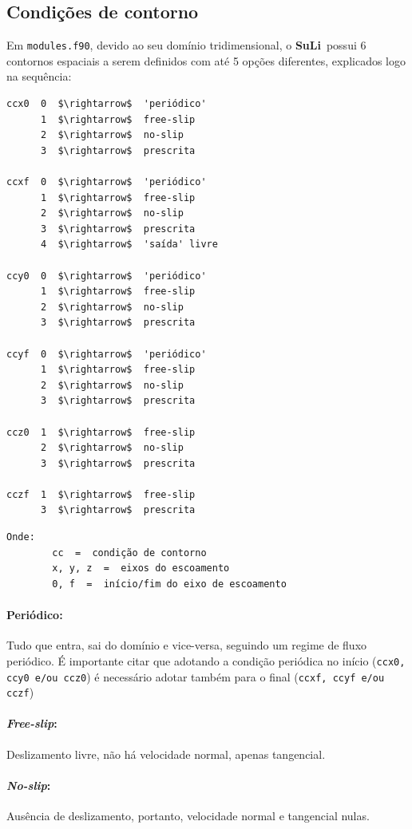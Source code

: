 \documentclass[12pt, a4paper]{article}
\newcommand{\SL}{{\bf SuLi}}
\begin{document}
\subsection{Condições de contorno}
Em \verb|modules.f90|, devido ao seu domínio tridimensional, o \SL\ possui 6 contornos espaciais a serem definidos com até 5 opções diferentes, explicados logo na sequência:
\begin{lstlisting}[escapeinside='']
ccx0  0  $\rightarrow$  'periódico'
      1  $\rightarrow$  free-slip
      2  $\rightarrow$  no-slip
      3  $\rightarrow$  prescrita

ccxf  0  $\rightarrow$  'periódico'
      1  $\rightarrow$  free-slip
      2  $\rightarrow$  no-slip
      3  $\rightarrow$  prescrita
      4  $\rightarrow$  'saída' livre
      
ccy0  0  $\rightarrow$  'periódico'
      1  $\rightarrow$  free-slip
      2  $\rightarrow$  no-slip
      3  $\rightarrow$  prescrita
      
ccyf  0  $\rightarrow$  'periódico'
      1  $\rightarrow$  free-slip
      2  $\rightarrow$  no-slip
      3  $\rightarrow$  prescrita
      
ccz0  1  $\rightarrow$  free-slip
      2  $\rightarrow$  no-slip
      3  $\rightarrow$  prescrita
      
cczf  1  $\rightarrow$  free-slip
      3  $\rightarrow$  prescrita
\end{lstlisting}

\begin{verbatim}
Onde: 	
		cc 	=  condição de contorno
		x, y, z  =  eixos do escoamento
		0, f  =  início/fim do eixo de escoamento
\end{verbatim}

\paragraph{Periódico:} Tudo que entra, sai do domínio e vice-versa, seguindo um regime de fluxo periódico. É importante citar que adotando a condição periódica no início (\verb|ccx0, ccy0 e/ou ccz0|) é necessário adotar também para o final (\verb|ccxf, ccyf e/ou cczf|)
\paragraph{\textit{Free-slip}:} Deslizamento livre, não há velocidade normal, apenas tangencial.
\paragraph{\textit{No-slip}:} Ausência de deslizamento, portanto, velocidade normal e tangencial nulas.
\end{document}
